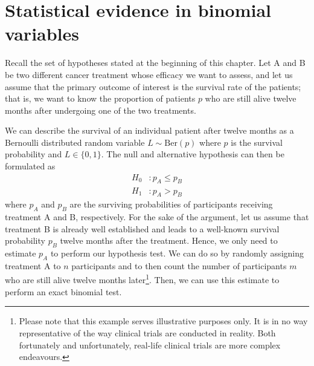\section{Statistical evidence in binomial variables}
\label{sec:binomial_var}
Recall the set of hypotheses stated at the beginning of this chapter. Let A and B be two different cancer treatment whose efficacy we want to assess, and let us assume that the primary outcome of interest is the survival rate of the patients; that is, we want to know the proportion of patients $p$ who are still alive twelve months after undergoing one of the two treatments.\par
We can describe the survival of an individual patient after twelve months as a Bernoulli distributed random variable ${L \sim \text{Ber}(p)}$ where $p$ is the survival probability and ${L \in \{0,1\}}$. The null and alternative hypothesis can then be formulated as
\begin{align*}
    H_0 &: p_A \leq p_B \\
    H_1 &: p_A > p_B
\end{align*}
where $p_A$ and $p_B$ are the surviving probabilities of participants receiving treatment A and B, respectively. For the sake of the argument, let us assume that treatment B is already well established and leads to a well-known survival probability $p_B$ twelve months after the treatment. Hence, we only need to estimate $p_A$ to perform our hypothesis test. We can do so by randomly assigning treatment A to $n$ participants and to then count the number of participants $m$ who are still alive twelve months later\footnote{Please note that this example serves illustrative purposes only. It is in no way representative of the way clinical trials are conducted in reality. Both fortunately and unfortunately, real-life clinical trials are more complex endeavours.}. Then, we can use this estimate to perform an exact binomial test.

